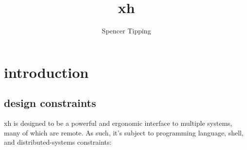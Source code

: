 \documentclass{report}
\title{xh}
\author{Spencer Tipping}
\begin{document}
\maketitle{}
\tableofcontents{}


\part{introduction}\label{part:introduction}
\chapter{design constraints}\label{chp:design-constraints}
  xh is designed to be a powerful and ergonomic interface to multiple systems,
  many of which are remote. As such, it's subject to programming language,
  shell, and distributed-systems constraints:
\end{document}
